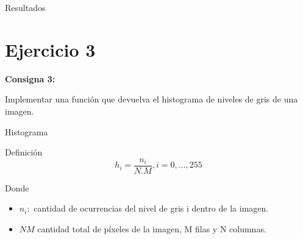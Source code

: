 \documentclass{beamer}
\begin{document}
\begin{frame}[fragile]{Resultados}
\begin{minipage}{0.45\linewidth}
		\label{fig:lenaej2}
	\end{minipage}
\end{frame}

\section{Ejercicio 3}

\begin{frame}
	\begin{center}
		\textcolor{unahurverde}{\textbf{Consigna 3:}}
	\end{center}
	\justifying
	
	Implementar una función que devuelva el histograma de niveles de gris de una imagen.
\end{frame}

\begin{frame}[fragile]{Histograma}
	\justifying
	
	\begin{block}{Definición}
		\[
		h_i = \frac{n_i}{N.M}, i=0,...,255
		\]
	\end{block}
	
	Donde
	
	\begin{itemize}
		\item $n_i:$ cantidad de ocurrencias del nivel de gris i dentro de la imagen.
		\item $NM$ cantidad total de píxeles de la imagen, M filas y N columnas.
	\end{itemize}
	
\end{frame}
\end{document}
